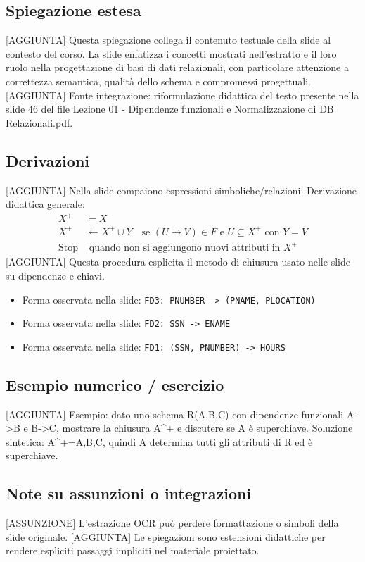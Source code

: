 \documentclass[11pt]{article}
\begin{document}
\subsection*{Spiegazione estesa}
[AGGIUNTA] Questa spiegazione collega il contenuto testuale della slide al contesto del corso. La slide enfatizza i concetti mostrati nell'estratto e il loro ruolo nella progettazione di basi di dati relazionali, con particolare attenzione a correttezza semantica, qualità dello schema e compromessi progettuali.
[AGGIUNTA] Fonte integrazione: riformulazione didattica del testo presente nella slide 46 del file Lezione 01 - Dipendenze funzionali e Normalizzazione di DB Relazionali.pdf.
\subsection*{Derivazioni}
[AGGIUNTA] Nella slide compaiono espressioni simboliche/relazioni. Derivazione didattica generale:
\begin{align*}
X^+ &= X \\
X^+ &\leftarrow X^+ \cup Y \quad \text{se } (U \to V) \in F \text{ e } U \subseteq X^+ \text{ con } Y=V \\
\text{Stop} &\text{ quando non si aggiungono nuovi attributi in } X^+
\end{align*}
[AGGIUNTA] Questa procedura esplicita il metodo di chiusura usato nelle slide su dipendenze e chiavi.
\begin{itemize}[leftmargin=*]
\item Forma osservata nella slide: \texttt{FD3: PNUMBER -> (PNAME, PLOCATION)}
\item Forma osservata nella slide: \texttt{FD2: SSN -> ENAME}
\item Forma osservata nella slide: \texttt{FD1: (SSN, PNUMBER) -> HOURS}
\end{itemize}
\subsection*{Esempio numerico / esercizio}
[AGGIUNTA] Esempio: dato uno schema R(A,B,C) con dipendenze funzionali A->B e B->C, mostrare la chiusura A^+ e discutere se A è superchiave. Soluzione sintetica: A^+={A,B,C}, quindi A determina tutti gli attributi di R ed è superchiave.
\subsection*{Note su assunzioni o integrazioni}
[ASSUNZIONE] L'estrazione OCR può perdere formattazione o simboli della slide originale.
[AGGIUNTA] Le spiegazioni sono estensioni didattiche per rendere espliciti passaggi impliciti nel materiale proiettato.
\end{document}
